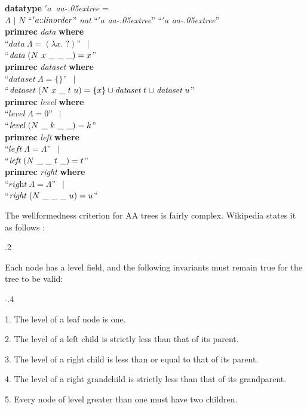 \documentclass[a4paper,12pt]{article}
\def\Colon{\mathord{:\mkern-1.5mu:}}
\def\unk{{?}}
\def\unkef{(\lambda x.\; \unk)}
\renewcommand\_{\hbox{\textunderscore\kern-.05ex}}
\begin{document}
\prew
\textbf{datatype} $'a$~\textit{aa\_tree} = \\
\hbox{}\quad $\Lambda$ $\mid$ $N$ ``\kern1pt$'a\Colon \textit{linorder\/}$'' \textit{nat} ``\kern1pt$'a$ \textit{aa\_tree}'' ``\kern1pt$'a$ \textit{aa\_tree}''  \\[2\smallskipamount]
\textbf{primrec} \textit{data} \textbf{where} \\
``$\textit{data}~\Lambda = \unkef$'' $\,\mid$ \\
``$\textit{data}~(N~x~\_~\_~\_) = x$'' \\[2\smallskipamount]
\textbf{primrec} \textit{dataset} \textbf{where} \\
``$\textit{dataset}~\Lambda = \{\}$'' $\,\mid$ \\
``$\textit{dataset}~(N~x~\_~t~u) = \{x\} \cup \textit{dataset}~t \mathrel{\cup} \textit{dataset}~u$'' \\[2\smallskipamount]
\textbf{primrec} \textit{level} \textbf{where} \\
``$\textit{level}~\Lambda = 0$'' $\,\mid$ \\
``$\textit{level}~(N~\_~k~\_~\_) = k$'' \\[2\smallskipamount]
\textbf{primrec} \textit{left} \textbf{where} \\
``$\textit{left}~\Lambda = \Lambda$'' $\,\mid$ \\
``$\textit{left}~(N~\_~\_~t~\_) = t$'' \\[2\smallskipamount]
\textbf{primrec} \textit{right} \textbf{where} \\
``$\textit{right}~\Lambda = \Lambda$'' $\,\mid$ \\
``$\textit{right}~(N~\_~\_~\_~u) = u$''
\postw

The wellformedness criterion for AA trees is fairly complex. Wikipedia states it
as follows \cite{wikipedia-2009-aa-trees}:

\kern.2\parskip %

\pre
Each node has a level field, and the following invariants must remain true for
the tree to be valid:

\raggedright

\kern-.4\parskip %

\begin{enum}
\item[]
\begin{enum}
\item[1.] The level of a leaf node is one.
\item[2.] The level of a left child is strictly less than that of its parent.
\item[3.] The level of a right child is less than or equal to that of its parent.
\item[4.] The level of a right grandchild is strictly less than that of its grandparent.
\item[5.] Every node of level greater than one must have two children.
\end{enum}
\end{enum}
\post
\end{document}
